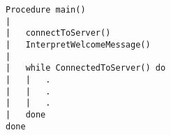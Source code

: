 \begin{lstlisting}
Procedure main()
|	
|	connectToServer()
|	InterpretWelcomeMessage()
|	
|	while ConnectedToServer() do
|	|	.
|	|	.
|	|	.
|	done
done
\end{lstlisting}